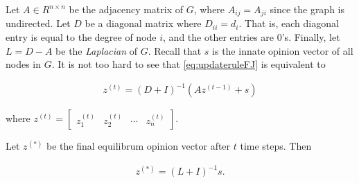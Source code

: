 Let $A \in R^{n \times n}$ be the adjacency matrix of $G$, where $A_{ij} = A_{ji}$ since the graph is undirected. Let $D$ be a diagonal matrix where $D_{ii} = d_i$. That is, each diagonal entry is equal to the degree of node $i$, and the other entries are 0's. Finally, let $L = D - A$ be the \emph{Laplacian} of $G$. Recall that ${s}$ is the innate opinion vector of all nodes in $G$.
It is not too hard to see that \cref{eq:updateruleFJ} is equivalent to

\begin{align}\label{updaterulelinalg}
    {z}^{(t)} = (D + I)^{-1}(A{z}^{(t-1)} + {s})
    \nonumber
\end{align}

where $ {z}^{(t)} = \begin{bmatrix} z_1^{(t)} & z_2^{(t)} & \cdots & z_n^{(t)} \end{bmatrix}$. 

Let ${z}^{(*)}$ be the final equilibrum opinion vector after $t$ time steps. Then 

\begin{align}\label{zstar}
    {z}^{(*)} = (L + I)^{-1}{s}.
    \nonumber
\end{align}


